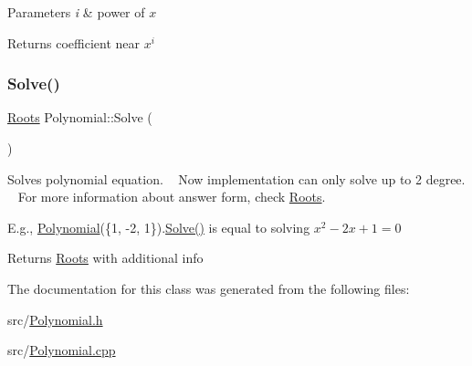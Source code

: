 \begin{DoxyParams}{Parameters}
{\em i} & power of $ x $ \\
\hline
\end{DoxyParams}
\begin{DoxyReturn}{Returns}
coefficient near $ x^i $ ~\newline
 
\end{DoxyReturn}
\mbox{\label{class_polynomial_ac1a8732edb10e52f5ff4bba6aee83593}} 
\subsubsection{\texorpdfstring{Solve()}{Solve()}}
{\footnotesize\ttfamily \mbox{\hyperlink{struct_roots}{Roots}} Polynomial\+::\+Solve (\begin{DoxyParamCaption}{ }\end{DoxyParamCaption})}

Solves polynomial equation. ~\newline
 Now implementation can only solve up to 2 degree. ~\newline
 For more information about answer form, check \mbox{\hyperlink{struct_roots}{Roots}}.

E.\+g., \mbox{\hyperlink{class_polynomial}{Polynomial}}(\{1, -\/2, 1\}).\mbox{\hyperlink{class_polynomial_ac1a8732edb10e52f5ff4bba6aee83593}{Solve()}} is equal to solving $ x^2 - 2x + 1 = 0 $

\begin{DoxyReturn}{Returns}
\mbox{\hyperlink{struct_roots}{Roots}} with additional info 
\end{DoxyReturn}


The documentation for this class was generated from the following files\+:\begin{DoxyCompactItemize}
\item 
src/\mbox{\hyperlink{_polynomial_8h}{Polynomial.\+h}}\item 
src/\mbox{\hyperlink{_polynomial_8cpp}{Polynomial.\+cpp}}\end{DoxyCompactItemize}
